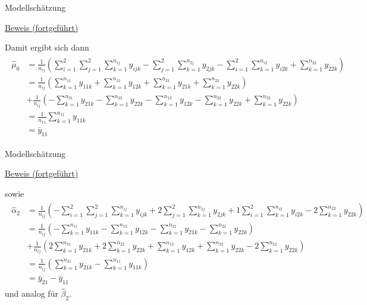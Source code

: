 \documentclass[
  8pt,
  ignorenonframetext,
]{beamer}
\begin{document}
\begin{frame}{Modellschätzung}
\protect\hypertarget{modellschuxe4tzung-11}{}
\footnotesize

\underline{Beweis (fortgeführt)}

Damit ergibt sich dann \tiny \begin{align}
\begin{split}
\hat{\mu}_0
& =
\frac{1}{n_{ij}}
\left(
  \sum_{i=1}^2 \sum_{j=1}^2 \sum_{k = 1}^{n_{ij}} y_{ijk}
- \sum_{j=1}^2 \sum_{k = 1}^{n_{2j}} y_{2jk}
- \sum_{i=1}^2 \sum_{k = 1}^{n_{i2}} y_{i2k}
+ \sum_{k = 1}^{n_{22}} y_{22k}
\right)
\\
& =
\frac{1}{n_{ij}}
\left(\sum_{k = 1}^{n_{11}} y_{11k} + \sum_{k = 1}^{n_{12}} y_{12k} + \sum_{k = 1}^{n_{21}} y_{21k} + \sum_{k = 1}^{n_{22}} y_{22k}\right)
\\
&
+ \frac{1}{n_{ij}}
\left(
  - \sum_{k = 1}^{n_{21}} y_{21k} - \sum_{k = 1}^{n_{22}} y_{22k}
  - \sum_{k = 1}^{n_{12}} y_{12k} - \sum_{k = 1}^{n_{22}} y_{22k}
  + \sum_{k = 1}^{n_{22}} y_{22k}
\right)
\\
& = \frac{1}{n_{11}} \sum_{k = 1}^{n_{11}} y_{11k}
\\
& = \bar{y}_{11}
\end{split}
\end{align}
\end{frame}

\begin{frame}{Modellschätzung}
\protect\hypertarget{modellschuxe4tzung-12}{}
\footnotesize

\underline{Beweis (fortgeführt)}

sowie \tiny \begin{align}
\begin{split}
\hat{\alpha}_2
& =
\frac{1}{n_{ij}}
\left(
-  \sum_{i=1}^2 \sum_{j=1}^2 \sum_{k = 1}^{n_{ij}} y_{ijk}
+ 2\sum_{j=1}^2 \sum_{k = 1}^{n_{2j}} y_{2jk}
+ 1\sum_{i=1}^2 \sum_{k = 1}^{n_{i2}} y_{i2k}
- 2 \sum_{k = 1}^{n_{22}} y_{22k}
\right)
\\
& =
\frac{1}{n_{ij}}
\left(
-\sum_{k = 1}^{n_{11}} y_{11k} - \sum_{k = 1}^{n_{12}} y_{12k} - \sum_{k = 1}^{n_{21}} y_{21k} - \sum_{k = 1}^{n_{22}} y_{22k}
\right)
\\
&
+ \frac{1}{n_{ij}}
\left(
  2\sum_{k = 1}^{n_{21}} y_{21k} +2\sum_{k = 1}^{n_{22}} y_{22k}
+  \sum_{k = 1}^{n_{12}} y_{12k} + \sum_{k = 1}^{n_{22}} y_{22k}
- 2\sum_{k = 1}^{n_{22}} y_{22k}
\right)
\\
&
= \frac{1}{n_{ij}}\left(\sum_{k = 1}^{n_{21}} y_{21k} - \sum_{k = 1}^{n_{11}} y_{11k}\right)
\\
&
= \bar{y}_{21} - \bar{y}_{11}
\end{split}
\end{align} \footnotesize und analog für \(\hat{\beta}_2\).
\end{frame}
\end{document}
